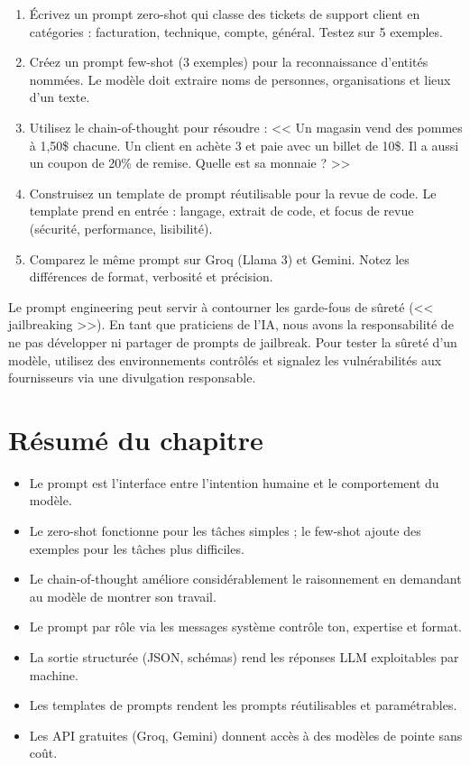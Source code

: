 \begin{exercise}
\begin{enumerate}
  \item \'Ecrivez un prompt zero-shot qui classe des tickets de support client en cat\'egories : facturation, technique, compte, g\'en\'eral. Testez sur 5 exemples.
  \item Cr\'eez un prompt few-shot (3 exemples) pour la reconnaissance d'entit\'es nomm\'ees. Le mod\`ele doit extraire noms de personnes, organisations et lieux d'un texte.
  \item Utilisez le chain-of-thought pour r\'esoudre : << Un magasin vend des pommes \`a 1,50\$ chacune. Un client en ach\`ete 3 et paie avec un billet de 10\$. Il a aussi un coupon de 20\% de remise. Quelle est sa monnaie ? >>
  \item Construisez un template de prompt r\'eutilisable pour la revue de code. Le template prend en entr\'ee : langage, extrait de code, et focus de revue (s\'ecurit\'e, performance, lisibilit\'e).
  \item Comparez le m\^eme prompt sur Groq (Llama 3) et Gemini. Notez les diff\'erences de format, verbosit\'e et pr\'ecision.
\end{enumerate}
\end{exercise}

\begin{ethicsbox}
Le prompt engineering peut servir \`a contourner les garde-fous de s\^uret\'e (<< jailbreaking >>). En tant que praticiens de l'IA, nous avons la responsabilit\'e de ne pas d\'evelopper ni partager de prompts de jailbreak. Pour tester la s\^uret\'e d'un mod\`ele, utilisez des environnements contr\^ol\'es et signalez les vuln\'erabilit\'es aux fournisseurs via une divulgation responsable.
\end{ethicsbox}

\section{R\'esum\'e du chapitre}

\begin{itemize}
  \item Le prompt est l'interface entre l'intention humaine et le comportement du mod\`ele.
  \item Le zero-shot fonctionne pour les t\^aches simples ; le few-shot ajoute des exemples pour les t\^aches plus difficiles.
  \item Le chain-of-thought am\'eliore consid\'erablement le raisonnement en demandant au mod\`ele de montrer son travail.
  \item Le prompt par r\^ole via les messages syst\`eme contr\^ole ton, expertise et format.
  \item La sortie structur\'ee (JSON, sch\'emas) rend les r\'eponses LLM exploitables par machine.
  \item Les templates de prompts rendent les prompts r\'eutilisables et param\'etrables.
  \item Les API gratuites (Groq, Gemini) donnent acc\`es \`a des mod\`eles de pointe sans co\^ut.
\end{itemize}
